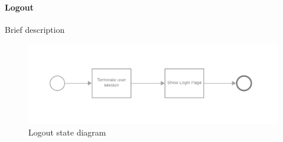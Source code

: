 \paragraph{Logout}
Brief description

\begin{figure}[H]
    \begin{center}
        \includegraphics[width=1\linewidth]{RASD/LaTeX/Images/StateDiagrams/logout.png}
        \caption{Logout state diagram}
        \label{fig:logout_sd}%
    \end{center}
\end{figure}

